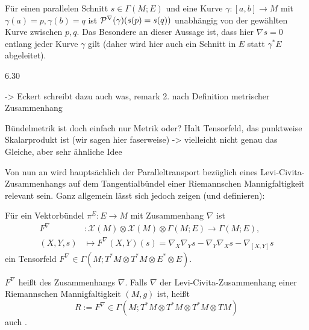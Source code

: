 \documentclass[../H_Analysis_main.tex]{subfiles}
\begin{document}
\begin{bsp}
Für einen parallelen Schnitt $s \in \Gamma(M; E)$ und eine Kurve $\gamma: [a, b] \rightarrow M$ mit $\gamma(a) = p, \gamma(b) = q$ ist $\mathcal{P}^\nabla(\gamma)\qty(s(p) = s(q))$ unabhängig von der gewählten Kurve zwischen $p, q$. Das Besondere an dieser Aussage ist, dass hier $\nabla s = 0$ entlang jeder Kurve $\gamma$ gilt (daher wird hier auch ein Schnitt in $E$ statt $\gamma^* E$ abgeleitet).
\end{bsp}






\begin{lemma}
6.30
\end{lemma}

-> Eckert schreibt dazu auch was, remark 2. nach Definition metrischer Zusammenhang

Bündelmetrik ist doch einfach nur Metrik oder? Halt Tensorfeld, das punktweise Skalarprodukt ist (wir sagen hier faserweise) -> vielleicht nicht genau das Gleiche, aber sehr ähnliche Idee



Von nun an wird hauptsächlich der Paralleltransport bezüglich eines Levi-Civita-Zusammenhangs auf dem Tangentialbündel einer Riemannschen Mannigfaltigkeit relevant sein. Ganz allgemein lässt sich jedoch zeigen (und definieren):

\begin{satz}
Für ein Vektorbündel $\pi^E: E \rightarrow M$ mit Zusammenhang $\nabla$ ist
\begin{equation}
\begin{split}
F^\nabla&: \mathcal{X}(M) \otimes \mathcal{X}(M) \otimes \Gamma(M; E) \rightarrow \Gamma(M; E),
\\
(X, Y, s) &\mapsto F^\nabla(X, Y)(s) = \nabla_X \nabla_Y s - \nabla_Y \nabla_X s - \nabla_{[X, Y]} s
\end{split}
\end{equation}
ein Tensorfeld $F^\nabla \in \Gamma(M; T^* M \otimes T^* M \otimes E^* \otimes E)$.
\end{satz}

\begin{defi}
$F^\nabla$ heißt  des Zusammenhangs $\nabla$. Falls $\nabla$ der Levi-Civita-Zusammenhang einer Riemannschen Mannigfaltigkeit $(M, g)$ ist, heißt
\begin{equation}
R := F^\nabla \in \Gamma(M; T^* M \otimes T^* M \otimes T^* M \otimes TM)
\end{equation}
auch .
\end{defi}
\end{document}
